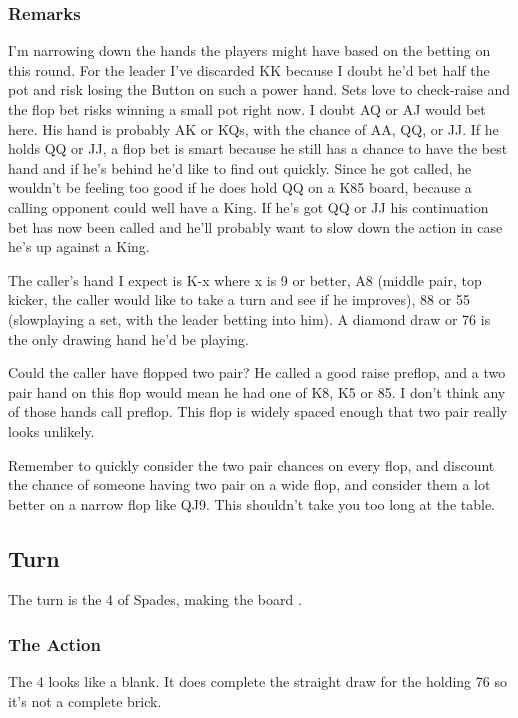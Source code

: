 \subsubsection*{Remarks}
I'm narrowing down the hands the players might have based on the betting
on this round. For the leader I've discarded KK because I doubt he'd bet
half the pot and risk losing the Button on such a power hand. Sets love
to check-raise and the flop bet risks winning a small pot right now. I doubt AQ
or AJ would bet here. His hand is probably AK or KQs, with the chance
of AA, QQ, or JJ. If he holds QQ or JJ, a flop bet is smart because
he still has a chance to have the best hand and if he's behind he'd like
to find out quickly. Since he got called, he wouldn't be feeling too good
if he does hold QQ on a K85 board, because a calling opponent could
well have a King. If he's got QQ or JJ his continuation bet has now
been called and he'll probably want to slow down the action in case
he's up against a King.

The caller's hand I expect is K-x where x is 9 or better, A8 (middle pair,
top kicker, the caller would like to take a turn and see if he improves),
88 or 55 (slowplaying a set, with the leader betting into him). A diamond
draw or 76 is the only drawing hand he'd be playing.

Could the caller have flopped two pair? He called a good raise preflop,
and a two pair hand on this flop would mean he had one of K8, K5 or 85.
I don't think any of those hands call preflop. This flop is widely spaced
enough that two pair really looks unlikely.

Remember to quickly consider the two pair chances on every flop, and
discount the chance of someone having two pair on a wide flop, and
consider them a lot better on a narrow flop like QJ9. This shouldn't
take you too long at the table.

\subsection*{Turn}

The turn is the 4 of Spades, making the board \Kc\eigd\fived\fours.

\subsubsection*{The Action}
The 4 looks like a blank. It does complete the straight draw for
the holding 76 so it's not a complete brick.

